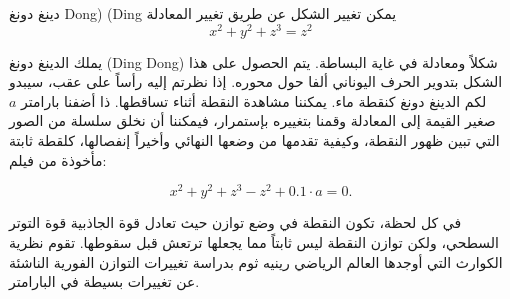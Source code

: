 \begin{surferPage}{دينغ دونغ Dong) (Ding}
يمكن تغيير الشكل عن طريق تغيير المعادلة\\

\smallskip
\[x^2	+ y^2	+ z^3	= z^2\]

\singlespacing
يملك الدينغ دونغ
\textenglish{(Ding Dong)} شكلاً ومعادلة في غاية البساطة.  يتم الحصول على هذا الشكل بتدوير الحرف اليوناني ألفا حول محوره. إذا نظرتم إليه رأساً على عقب، سيبدو لكم الدينغ دونغ كنقطة ماء. يمكننا مشاهدة النقطة أثناء تساقطها.
\newline
ذا أضفنا بارامتر  $a$  صغير القيمة إلى المعادلة وقمنا بتغييره بإستمرار، فيمكننا أن نخلق سلسلة من الصور التي تبين ظهور النقطة، وكيفية تقدمها من وضعها النهائي وأخيراً إنفصالها، كلقطة ثابتة مأخوذة من فيلم:


\[x^2	+ y^2	+ z^3	-z^2+0.1\cdot a=0.\]

في كل لحظة، تكون النقطة في وضع توازن حيث تعادل قوة الجاذبية قوة التوتر السطحي، ولكن توازن النقطة ليس ثابتاً مما يجعلها ترتعش قبل سقوطها. تقوم نظرية الكوارث التي أوجدها العالم الرياضي رينيه ثوم بدراسة تغييرات التوازن الفورية الناشئة عن تغييرات بسيطة في البارامتر.
\end{surferPage}
